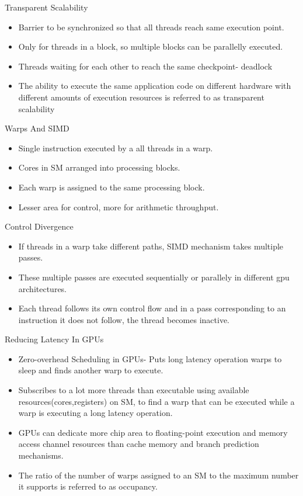 \documentclass{beamer}
\begin{document}
\begin{frame}{Transparent Scalability}
    \begin{itemize}
        \item Barrier to be synchronized so that all threads reach same execution point.
        \item Only for threads in a block, so multiple blocks can be parallelly executed.
        \item Threads waiting for each other to reach the same checkpoint- deadlock
        \item The ability to execute the same application code on different hardware with different
        amounts of execution resources is referred to as transparent scalability
    \end{itemize}
\end{frame}
\begin{frame}{Warps And SIMD}
    \begin{itemize}
        \item Single instruction executed by a all threads in a warp.
        \item Cores in SM arranged into processing blocks.
        \item Each warp is assigned to the same processing block. 
        \item Lesser area for control, more for arithmetic throughput.
    \end{itemize}
\end{frame}
\begin{frame}{Control Divergence}
    \begin{itemize}
        \item If threads in a warp take different paths, SIMD mechanism takes multiple passes.
        \item These multiple passes are executed sequentially or parallely in different gpu architectures.
        \item Each thread follows its own control flow and in a pass corresponding to an instruction it does not follow, the thread becomes inactive.
    \end{itemize}
\end{frame}
\begin{frame}{Reducing Latency In GPUs}
    \begin{itemize}
        \item Zero-overhead Scheduling in GPUs- Puts long latency operation warps to sleep and finds another warp to execute.
        \item Subscribes to a lot more threads than executable using available resources(cores,registers) on SM, to find a warp that can be executed while a warp is executing a long latency operation.
        \item GPUs can dedicate more chip area to floating-point execution and memory access channel resources than cache memory and branch prediction mechanisms.
        \item The ratio of the number of warps assigned to an SM to the maximum number it supports is referred to as occupancy.
    \end{itemize}
\end{frame}
\end{document}
